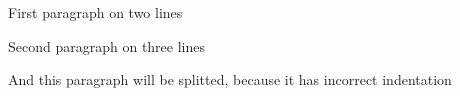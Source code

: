 First paragraph on two lines

Second paragraph on three lines

And this paragraph
will be splitted, because it has incorrect
indentation
